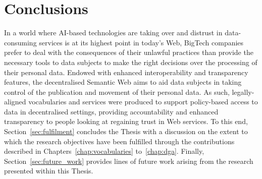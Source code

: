 \chapter{Conclusions}
\label{chap:conclusions}

In a world where AI-based technologies are taking over and distrust in data-consuming services is at its highest point in today's Web, BigTech companies prefer to deal with the consequences of their unlawful practices than provide the necessary tools to data subjects to make the right decisions over the processing of their personal data.
Endowed with enhanced interoperability and transparency features, the decentralised Semantic Web aims to aid data subjects in taking control of the publication and movement of their personal data.
As such, legally-aligned vocabularies and services were produced to support policy-based access to data in decentralised settings, providing accountability and enhanced transparency to people looking at regaining trust in Web services. 
To this end, Section~\ref{sec:fulfilment} concludes the Thesis with a discussion on the extent to which the research objectives have been fulfilled through the contributions described in Chapters~\ref{chap:vocabularies} to~\ref{chap:dga}.
Finally, Section~\ref{sec:future_work} provides lines of future work arising from the research presented within this Thesis.


